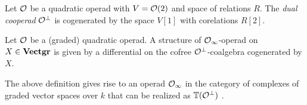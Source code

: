 \documentclass[TFM.tex]{subfiles}
\begin{document}
\begin{defi}
Let ${\mathcal O}$ be a quadratic operad with $V={\mathcal O}(2)$ and space of relations $R$. The \emph{dual cooperad} ${\mathcal O}^{\perp}$ is cogenerated by the space $V[1]$ with corelations $R[2]$.
\end{defi}


\begin{defi}
Let ${\mathcal O}$ be a (graded) quadratic operad. A structure of ${\mathcal O}_\infty$-operad on $X\in\mathrm{\mathbf{Vectgr}}$ is given by a differential on the cofree ${\mathcal O}^\perp$-coalgebra cogenerated by $X$.
\end{defi}

The above definition gives rise to an operad ${\mathcal O}_\infty$ in the category of complexes of graded vector spaces over $k$ that can be realized as $\mathbb{T}({\mathcal O}^\perp)$ \cite{Hinich}. 
\end{document}
